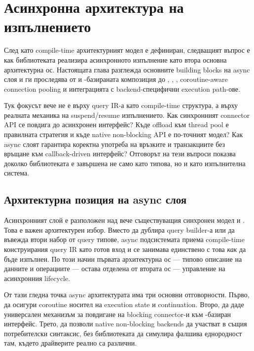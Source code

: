 \section{Асинхронна архитектура на изпълнението}
\label{sec:async_execution_architecture}

След като compile-time архитектурният модел е дефиниран, следващият въпрос е как библиотеката реализира асинхронното изпълнение като втора основна архитектурна ос. Настоящата глава разглежда основните building blocks на async слоя и ги проследява от  и -базираната композиция до , , , coroutine-aware connection pooling и интеграцията с backend-специфични execution path-ове.

Тук фокусът вече не е върху query IR-а като compile-time структура, а върху реалната механика на suspend/resume изпълнението. Как синхронният connector API се повдига до асинхронен интерфейс? Къде offload към thread pool е правилната стратегия и къде native non-blocking API е по-точният модел? Как async слоят гарантира коректна употреба на връзките и транзакциите без връщане към callback-driven интерфейс? Отговорът на тези въпроси показва доколко библиотеката е завършена не само като типова, но и като изпълнителна система.

\subsection{Архитектурна позиция на async слоя}

Асинхронният слой е разположен над вече съществуващия синхронен модел  и . Това е важен архитектурен избор. Вместо да дублира query builder-а или да въвежда втори набор от query типове, async подсистемата приема compile-time конструирания query IR като готов вход и се занимава единствено с това \emph{как} да бъде изпълнен. По този начин първата архитектурна ос --- типово описание на данните и операциите --- остава отделена от втората ос --- управление на асинхронния lifecycle.

От тази гледна точка async архитектурата има три основни отговорности. Първо, да осигури coroutine носител на execution state и continuation. Второ, да даде универсален механизъм за повдигане на blocking connector-и към -базиран интерфейс. Трето, да позволи native non-blocking backends да участват в същия потребителски синтаксис, без библиотеката да симулира фалшива еднородност там, където драйверите реално са различни.

